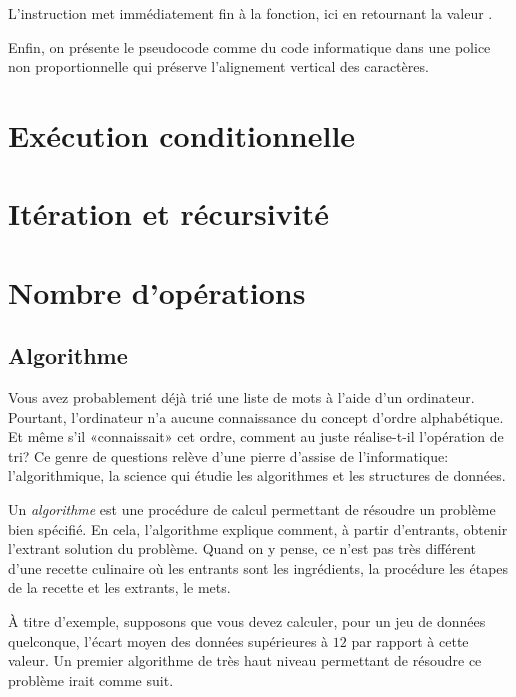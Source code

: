 L'instruction  met immédiatement fin à la fonction,
ici en retournant la valeur .

Enfin, on présente le pseudocode comme du code informatique dans une
police non proportionnelle qui préserve l'alignement vertical des
caractères.


\section{Exécution conditionnelle}
\label{sec:algorithmes:if-else}

\section{Itération et récursivité}
\label{sec:algorithmes:iteration}

\section{Nombre d'opérations}
\label{sec:algorithmes:bigO}




\subsection{Algorithme}
\label{sec:informatique:concepts:algorithme}

Vous avez probablement déjà trié une liste de mots à l'aide d'un
ordinateur. Pourtant, l'ordinateur n'a aucune connaissance du concept
d'ordre alphabétique. Et même s'il «connaissait» cet ordre, comment au
juste réalise-t-il l'opération de tri? Ce genre de questions relève
d'une pierre d'assise de l'informatique:
l'algorithmique, la science qui étudie les
algorithmes et les structures de données.

Un \emph{algorithme} est une procédure de calcul
permettant de résoudre un problème bien spécifié. En cela,
l'algorithme explique comment, à partir d'entrants, obtenir l'extrant
solution du problème. Quand on y pense, ce n'est pas très différent
d'une recette culinaire où les entrants sont les ingrédients, la
procédure les étapes de la recette et les extrants, le mets.

À titre d'exemple, supposons que vous devez calculer, pour un jeu de
données quelconque, l'écart moyen des données supérieures à $12$ par
rapport à cette valeur. Un premier algorithme de très haut niveau
permettant de résoudre ce problème irait comme suit.

